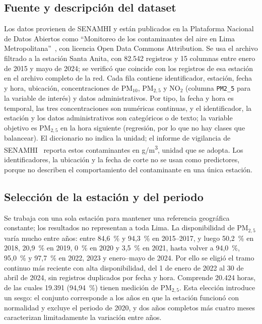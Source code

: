 \subsection{Fuente y descripción del dataset}
\label{sec:fuente}
Los datos provienen de SENAMHI y están publicados en la Plataforma Nacional de Datos Abiertos como ``Monitoreo de los contaminantes del aire en Lima Metropolitana''~\cite{senamhi_datos_2025}, con licencia Open Data Commons Attribution. Se usa el archivo filtrado a la estación Santa Anita, con 82.542 registros y 15 columnas entre enero de 2015 y mayo de 2024; se verificó que coincide con los registros de esa estación en el archivo completo de la red. Cada fila contiene identificador, estación, fecha y hora, ubicación, concentraciones de PM$_{10}$, PM$_{2{,}5}$ y NO$_2$ (columna \texttt{PM2\_5} para la variable de interés) y datos administrativos. Por tipo, la fecha y hora es temporal, las tres concentraciones son numéricas continuas, y el identificador, la estación y los datos administrativos son categóricos o de texto; la variable objetivo es PM$_{2{,}5}$ en la hora siguiente (regresión, por lo que no hay clases que balancear). El diccionario no indica la unidad; el informe de vigilancia de SENAMHI~\cite{senamhi_vigilancia_2021} reporta estos contaminantes en \textmu g/m\textsuperscript{3}, unidad que se adopta. Los identificadores, la ubicación y la fecha de corte no se usan como predictores, porque no describen el comportamiento del contaminante en una única estación.

\subsection{Selección de la estación y del periodo}
\label{sec:periodo}
Se trabaja con una sola estación para mantener una referencia geográfica constante; los resultados no representan a toda Lima. La disponibilidad de PM$_{2{,}5}$ varía mucho entre años: entre 84,6~\% y 94,3~\% en 2015--2017, y luego 50,2~\% en 2018, 20,9~\% en 2019, 0~\% en 2020 y 3,5~\% en 2021, hasta volver a 94,0~\%, 95,0~\% y 97,7~\% en 2022, 2023 y enero--mayo de 2024. Por ello se eligió el tramo continuo más reciente con alta disponibilidad, del 1 de enero de 2022 al 30 de abril de 2024, sin registros duplicados por fecha y hora. Comprende 20.424 horas, de las cuales 19.391 (94,94~\%) tienen medición de PM$_{2{,}5}$. Esta elección introduce un sesgo: el conjunto corresponde a los años en que la estación funcionó con normalidad y excluye el periodo de 2020, y dos años completos más cuatro meses caracterizan limitadamente la variación entre años.
